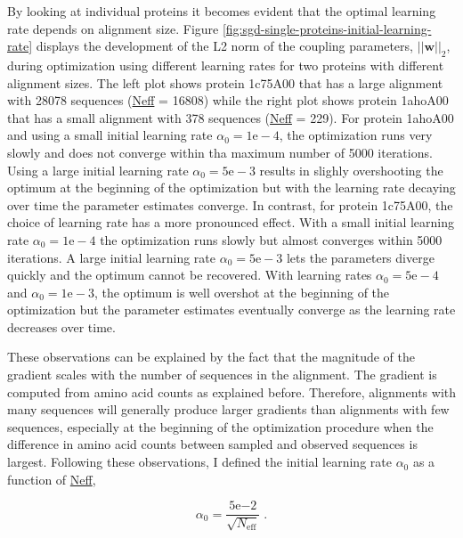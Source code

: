 \documentclass[11pt,a4paper,twoside]{book}
\newcommand{\eq}{\!=\!}
\newcommand{\w}{\mathbf{w}}
\theoremstyle{definition}
\theoremstyle{definition}
\theoremstyle{remark}
\begin{document}
By looking at individual proteins it becomes evident that the optimal
learning rate depends on alignment size. Figure
\ref{fig:sgd-single-proteins-initial-learning-rate} displays the
development of the L2 norm of the coupling parameters, \(||\w||_2\),
during optimization using different learning rates for two proteins with
different alignment sizes. The left plot shows protein 1c75A00 that has
a large alignment with 28078 sequences (\protect\hyperlink{abbrev}{Neff}
= 16808) while the right plot shows protein 1ahoA00 that has a small
alignment with 378 sequences (\protect\hyperlink{abbrev}{Neff} = 229).
For protein 1ahoA00 and using a small initial learning rate
\(\alpha_0 \eq \mathrm{1e-4}\), the optimization runs very slowly and
does not converge within tha maximum number of 5000 iterations. Using a
large initial learning rate \(\alpha_0 \eq \mathrm{5e-3}\) results in
slighly overshooting the optimum at the beginning of the optimization
but with the learning rate decaying over time the parameter estimates
converge. In contrast, for protein 1c75A00, the choice of learning rate
has a more pronounced effect. With a small initial learning rate
\(\alpha_0 \eq \mathrm{1e-4}\) the optimization runs slowly but almost
converges within 5000 iterations. A large initial learning rate
\(\alpha_0 \eq \mathrm{5e-3}\) lets the parameters diverge quickly and
the optimum cannot be recovered. With learning rates
\(\alpha_0 \eq \mathrm{5e-4}\) and \(\alpha_0 \eq \mathrm{1e-3}\), the
optimum is well overshot at the beginning of the optimization but the
parameter estimates eventually converge as the learning rate decreases
over time.

These observations can be explained by the fact that the magnitude of
the gradient scales with the number of sequences in the alignment. The
gradient is computed from amino acid counts as explained before.
Therefore, alignments with many sequences will generally produce larger
gradients than alignments with few sequences, especially at the
beginning of the optimization procedure when the difference in amino
acid counts between sampled and observed sequences is largest. Following
these observations, I defined the initial learning rate \(\alpha_0\) as
a function of \protect\hyperlink{abbrev}{Neff},

\begin{equation}
  \alpha_0 = \frac{5\mathrm{e}{-2}}{\sqrt{N_{\text{eff}}}} \; .
  \label{eq:learning-rate-wrt-neff}
\end{equation}
\end{document}
